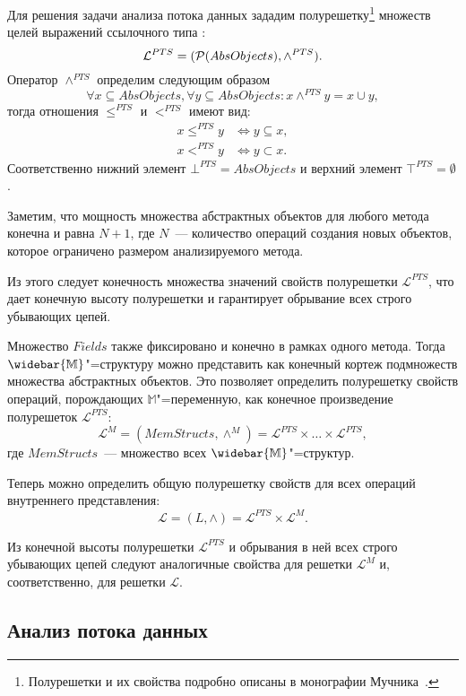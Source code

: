 \documentclass[14pt,titlepage,draft]{extarticle}
\newcommand{\M}{\ensuremath{\mathbb{M}}}
\newcommand{\Ms}{\ensuremath{\mathbb{\widebar{M}}}}
\newcommand{\Lattice}{\mathcal{L}}
\newcommand{\meet}{\wedge}
\begin{document}
    Для решения задачи анализа потока данных зададим полурешетку\footnote{
      Полурешетки и их свойства подробно описаны в монографии
      Мучника~\cite{muchnick}.
    }
    множеств целей выражений ссылочного типа :
    \[ \Lattice^{PTS} = (\powerset{AbsObjects}, \meet^{PTS}).\]
    Оператор $\meet^{PTS}$ определим следующим образом
    \[
      \forall x \subseteq AbsObjects, \forall y \subseteq AbsObjects
      \colon
      x \meet^{PTS} y = x \cup y,
    \]
    тогда отношения $\leq^{PTS}$ и $<^{PTS}$ имеют вид:
    \begin{align*}
      x \leq^{PTS} y &\Leftrightarrow y \subseteq x, \\
      x <^{PTS} y &\Leftrightarrow y \subset x.
    \end{align*}
    Соответственно нижний элемент $\bot^{PTS} = AbsObjects$
    и верхний элемент $\top^{PTS} = \emptyset$.

    Заметим, что мощность множества абстрактных объектов для любого
    метода конечна и равна $N + 1$,
    где $N$~--- количество операций создания новых объектов, которое ограничено
    размером анализируемого метода.

    Из этого следует конечность множества значений свойств полурешетки
    $\Lattice^{PTS}$, что дает конечную высоту полурешетки и гарантирует
    обрывание всех строго убывающих цепей.

    Множество $Fields$ также фиксировано и конечно в рамках одного метода.
    Тогда \Ms"=структуру можно представить как конечный кортеж подмножеств
    множества абстрактных объектов.
    Это позволяет определить полурешетку свойств операций, порождающих
    \M"=переменную, как конечное произведение полурешеток $\Lattice^{PTS}$:
    \[\Lattice^M = (MemStructs, \meet^M) =
      \Lattice^{PTS} \times \ldots \times \Lattice^{PTS},\]
    где $MemStructs$~--- множество всех \Ms"=структур.

    Теперь можно определить общую полурешетку свойств для всех операций
    внутреннего представления:
    \[ \Lattice = (L, \meet) = \Lattice^{PTS} \times \Lattice^M. \]

    Из конечной высоты полурешетки $\Lattice^{PTS}$
    и обрывания в ней всех строго убывающих цепей следуют аналогичные свойства
    для решетки $\Lattice^M$ и, соответственно, для решетки $\Lattice$.

  \subsection{Анализ потока данных}
\end{document}
